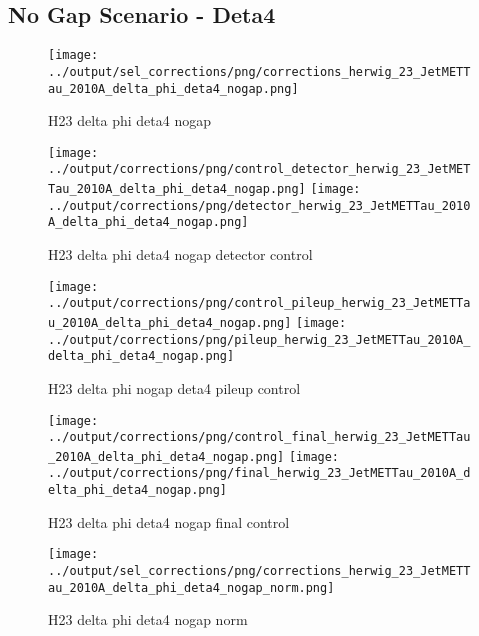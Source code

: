 \documentclass[11pt]{book}
\begin{document}
\clearpage
\subsection{No Gap Scenario - Deta4}

\begin{figure}[ht]
\centering
\texttt{[image: ../output/sel\_corrections/png/corrections\_herwig\_23\_JetMETTau\_2010A\_delta\_phi\_deta4\_nogap.png]}
\caption{H23 delta phi deta4 nogap}
\label{fig:H23_JetMETTau_2010A_delta_phi_deta4_nogap}
\end{figure}

\begin{figure}[ht]
\centering
\texttt{[image: ../output/corrections/png/control\_detector\_herwig\_23\_JetMETTau\_2010A\_delta\_phi\_deta4\_nogap.png]}
\texttt{[image: ../output/corrections/png/detector\_herwig\_23\_JetMETTau\_2010A\_delta\_phi\_deta4\_nogap.png]}
\caption{H23 delta phi deta4 nogap detector control}
\label{fig:H23_JetMETTau_2010A_delta_phi_deta4_nogap_detector_control}
\end{figure}

\begin{figure}[ht]
\centering
\texttt{[image: ../output/corrections/png/control\_pileup\_herwig\_23\_JetMETTau\_2010A\_delta\_phi\_deta4\_nogap.png]}
\texttt{[image: ../output/corrections/png/pileup\_herwig\_23\_JetMETTau\_2010A\_delta\_phi\_deta4\_nogap.png]}
\caption{H23 delta phi nogap deta4 pileup control}
\label{fig:H23_JetMETTau_2010A_delta_phi_deta4_nogap_pileup_control}
\end{figure}


\begin{figure}[ht]
\centering
\texttt{[image: ../output/corrections/png/control\_final\_herwig\_23\_JetMETTau\_2010A\_delta\_phi\_deta4\_nogap.png]}
\texttt{[image: ../output/corrections/png/final\_herwig\_23\_JetMETTau\_2010A\_delta\_phi\_deta4\_nogap.png]}
\caption{H23 delta phi deta4 nogap final control}
\label{fig:H23_JetMETTau_2010A_delta_phi_deta4_nogap_final_control}
\end{figure}

\begin{figure}[ht]
\centering
\texttt{[image: ../output/sel\_corrections/png/corrections\_herwig\_23\_JetMETTau\_2010A\_delta\_phi\_deta4\_nogap\_norm.png]}
\caption{H23 delta phi deta4 nogap norm}
\label{fig:H23_JetMETTau_2010A_delta_phi_deta4_nogap_norm}
\end{figure}
\end{document}
